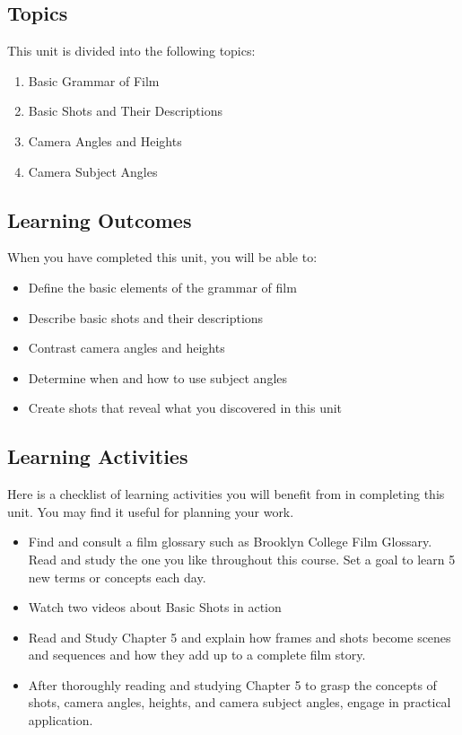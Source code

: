 \documentclass[
  letterpaper,
  DIV=11,
  numbers=noendperiod]{scrreprt}
\providecommand{\tightlist}{%
  \setlength{\itemsep}{0pt}\setlength{\parskip}{0pt}}\usepackage{longtable,booktabs,array}
\begin{document}
\subsection*{Topics}\label{topics-4}

This unit is divided into the following topics:

\begin{enumerate}
\def\labelenumi{\arabic{enumi}.}
\tightlist
\item
  Basic Grammar of Film
\item
  Basic Shots and Their Descriptions
\item
  Camera Angles and Heights
\item
  Camera Subject Angles
\end{enumerate}

\subsection*{Learning Outcomes}\label{learning-outcomes-4}

When you have completed this unit, you will be able to:

\begin{itemize}
\tightlist
\item
  Define the basic elements of the grammar of film
\item
  Describe basic shots and their descriptions
\item
  Contrast camera angles and heights
\item
  Determine when and how to use subject angles
\item
  Create shots that reveal what you discovered in this unit
\end{itemize}

\subsection*{Learning Activities}\label{learning-activities-4}

Here is a checklist of learning activities you will benefit from in
completing this unit. You may find it useful for planning your work.

\begin{itemize}
\tightlist
\item
  Find and consult a film glossary such as Brooklyn College Film
  Glossary. Read and study the one you like throughout this course. Set
  a goal to learn 5 new terms or concepts each day.
\item
  Watch two videos about Basic Shots in action
\item
  Read and Study Chapter 5 and explain how frames and shots become
  scenes and sequences and how they add up to a complete film story.
\item
  After thoroughly reading and studying Chapter 5 to grasp the concepts
  of shots, camera angles, heights, and camera subject angles, engage in
  practical application.
\end{itemize}
\end{document}
